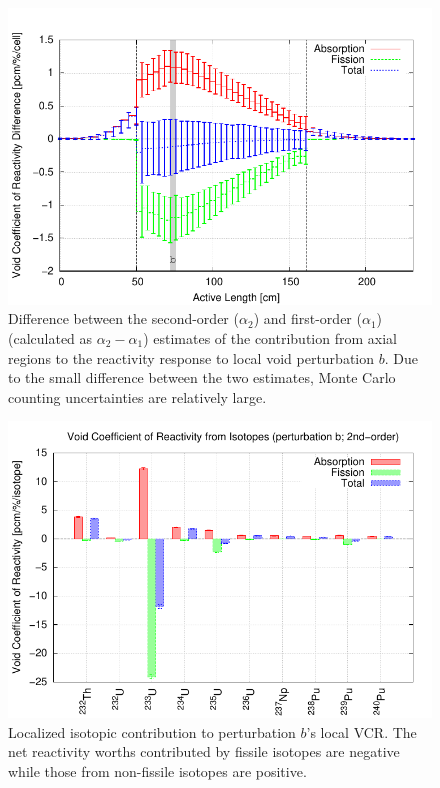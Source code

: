 \documentclass[11pt]{article}
\begin{document}
\clearpage
\begin{figure}[p]
  \centering
  \includegraphics[width=\textwidth, trim=0 0 0 0.275in, clip]{./img/Th-b-Traverse12Cmp.pdf}
  \caption{Difference between the second-order ($\alpha_2$) and first-order ($\alpha_1$) (calculated as $\alpha_2-\alpha_1$) estimates of the contribution from axial regions to the reactivity response to local void perturbation $b$. Due to the small difference between the two estimates, Monte Carlo counting uncertainties are relatively large.}
  \label{fig:deltaAlphaR}
\end{figure}

\clearpage
\begin{figure}[p]
  \centering
  \includegraphics[width=\textwidth, trim=0 0 0 0.275in, clip]{./img/Th-b-IsotopeAlpha2.pdf}
  \caption{Localized isotopic contribution to perturbation $b$'s local VCR. The net reactivity worths contributed by fissile isotopes are negative while those from non-fissile isotopes are positive.}
  \label{fig:alpha2I}
\end{figure}
\end{document}
